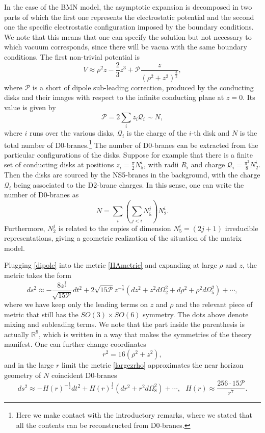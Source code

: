 \documentclass[11pt,english]{article}
\newcommand{\be}{\begin{equation}}
\newcommand{\ee}{\end{equation}}
\numberwithin{equation}{section}
\begin{document}
In the case of the BMN model, the asymptotic expansion is decomposed in two parts of which the first one represents the electrostatic potential and the second one the specific electrostatic configuration imposed by the boundary conditions. We note that this means that one can specify the solution but not necessary to which vacuum corresponds, since there will be vacua with the same boundary conditions. The first non-trivial potential is \cite{Maldacena2003}
\be \label{dipole}
V\approx \rho^2 z-\frac{2}{3}z^3+\mathcal{P}\frac{z}{\left(\rho^2+z^2\right)^\frac{3}{2}},
\ee
where $\mathcal{P}$ is a short of dipole sub-leading correction, produced by the conducting disks and their images with respect to the infinite conducting plane at $z=0$. Its value is given by 
\be 
\mathcal{P}=2\sum_iz_i\mathcal{Q}_i\sim N,
\ee
where $i$ runs over the various disks, $\mathcal{Q}_i$ is the charge of the $i$-th disk and $N$ is the total number of D0-branes.\footnote{Here we make contact with the introductory remarks, where we stated that all the contents can be reconstructed from D0-branes.} The number of D0-branes can be extracted from the particular configurations of the disks. Suppose for example that there is a finite set of conducting disks at positions $z_i=\frac{\pi}{2}N_5^{i}$, with radii $R_i$ and charge $\mathcal{Q}_i=\frac{\pi^2}{8}N_2^{i}$. Then the disks are sourced by the NS5-branes in the background, with the charge $\mathcal{Q}_i$ being associated to the D2-brane charges. In this sense, one can write the number of D0-branes as 
\be 
N=\sum_{i}\left(\sum_{j<i}N_5^{j}\right)N_2^{i}.
\ee    
Furthermore,  $N_2^{j}$ is related to the copies of dimension $N_5^{i}=(2j+1)$ irreducible representations, giving a geometric realization of the situation of the matrix model.

\noindent
Plugging  \eqref{dipole} into the metric \eqref{IIAmetric} and expanding at large $\rho$ and $z$, the metric takes the form 
\be \label{largezrho}
ds^2\approx -\frac{8z^{\frac{7}{2}}}{\sqrt{15\mathcal{P}}}dt^2+2\sqrt{15\mathcal{P}}z^{-\frac{7}{2}}\left(dz^2+z^2d\Omega_2^2+d\rho^2+\rho^2d\Omega_5^2\right)+\cdots,
\ee
where we have keep only the leading terms on $z$ and $\rho$ and the relevant piece of metric that still has the $SO(3)\times SO(6)$ symmetry. The dots above denote mixing and subleading terms. We note that the part inside the parenthesis is actually $\mathbb{R}^9$, which is written in a way that makes the symmetries of the theory manifest. One can further change coordinates 
\be \label{coordchange}
r^2=16\left(\rho^2+z^2\right),
\ee
 and in the large $r$ limit the metric  \eqref{largezrho} approximates the near horizon geometry of $N$ coincident D0-branes
\be \label{larger}
ds^2\approx -H(r)^{-\frac{1}{2}}dt^2+H(r)^{\frac{1}{2}}\left(dr^2+r^2d\Omega_8^2\right)+\cdots,~~~H(r)\approx \frac{256\cdot 15\mathcal{P}}{r^7}.
\ee
\end{document}
